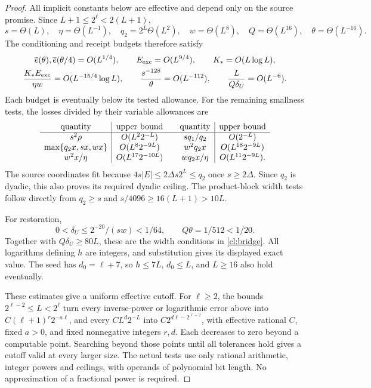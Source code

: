 \documentclass[11pt]{article} \usepackage[utf8]{inputenc}
\theoremstyle{plain} \newtheorem{theorem}{Theorem}[section]
\theoremstyle{definition} \newaliascnt{definition}{theorem}
\begin{document}
\begin{proof}
All implicit constants below are effective and depend only on the source
promise. Since $L+1\le2^\ell<2(L+1)$,
\[
s=\Theta(L),\quad \eta=\Theta(L^{-1}),\quad
q_2=2^L\Theta(L^2),\quad w=\Theta(L^8),\quad
Q=\Theta(L^{16}),\quad \theta=\Theta(L^{-16}).
\]
The conditioning and receipt budgets therefore satisfy
\[
\begin{gathered}
\overline e(\theta),\overline e(\theta/4)=O(L^{1/4}),\qquad
E_{\rm exc}=O(L^{9/4}),\qquad K_*=O(L\log L),\\
\frac{K_*E_{\rm exc}}{\eta w}=O(L^{-15/4}\log L),\qquad
\frac{s^{-128}}\theta=O(L^{-112}),\qquad
\frac{L}{Q\delta_U}=O(L^{-6}).
\end{gathered}
\]
Each budget is eventually below its tested allowance. For the remaining
smallness tests, the losses divided by their variable allowances are
\[
\begin{array}{c|c@{\qquad}c|c}
\text{quantity}&\text{upper bound}&\text{quantity}&\text{upper bound}\\ \hline
s^2\rho&O(L^2 2^{-L})&sq_1/q_2&O(2^{-L})\\
\max\{q_2x,sx,wx\}&O(L^8 2^{-9L})&
w^2q_2x&O(L^{18}2^{-9L})\\
w^2x/\eta&O(L^{17}2^{-10L})&
wq_2x/\eta&O(L^{11}2^{-9L}).
\end{array}
\]
The source coordinates fit because
$4s|E|\le2\Delta s2^L\le q_2$ once $s\ge2\Delta$.
Since $q_2$ is dyadic, this also proves its required dyadic ceiling.
The product-block width tests follow directly from $q_2\ge s$ and
$s/4096\ge16(L+1)>10L$.

For restoration,
\[
0<\delta_U\le2^{-20}/(sw)<1/64,\qquad Q\theta=1/512<1/20.
\]
Together with $Q\delta_U\ge80L$, these are the width conditions in
\cref{cl:bridge}. All logarithms defining $h$ are integers, and substitution
gives its displayed exact value. The seed has $d_0=\ell+7$, so $h\le7L$,
$d_0\le L$, and $L\ge16$ also hold eventually.

These estimates give a uniform effective cutoff. For $\ell\ge2$, the bounds
$2^{\ell-2}\le L<2^\ell$ turn every inverse-power or logarithmic error above
into $C(\ell+1)^r2^{-a\ell}$, and every $CL^d2^{-L}$ into
$C2^{d\ell-2^{\ell-2}}$, with effective rational $C$, fixed $a>0$, and fixed
nonnegative integers $r,d$. Each decreases to zero beyond a computable
point. Searching beyond those points until all tolerances hold gives a
cutoff valid at every larger size. The actual tests use only rational
arithmetic, integer powers and ceilings, with operands of polynomial bit
length. No approximation of a fractional power is required.
\end{proof}
\end{document}
